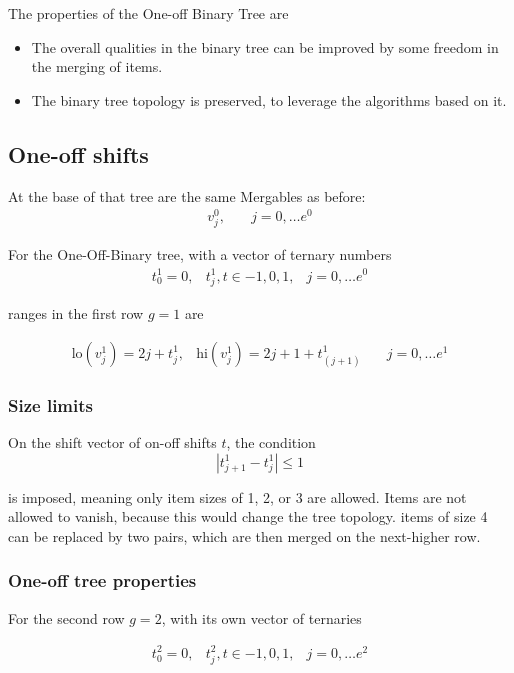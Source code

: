 \documentclass{article}
\theoremstyle{plain}
\begin{document}
The properties of the One-off Binary Tree are
\begin{itemize}
    \item The overall qualities in the binary tree can be improved by some freedom in the merging of items.
    \item The binary tree topology is preserved, to leverage the algorithms based on it.
\end{itemize}

\subsection*{One-off shifts}
At the base of that tree are the same Mergables as before:
\begin{align*}
    v^0_j, & \quad j = 0, \dots e^0
\end{align*}

For the One-Off-Binary tree, with a vector of ternary numbers 
\begin{align*}
   t^1_{0} = 0, &   t^1_{j} , t \in {-1, 0, 1},  &  j = 0, \dots e^0
\end{align*}

ranges in the first row $g=1$ are

\begin{align*}
   \text{lo}( v^1_j) = 2j +t^1_j , &  \text{hi}( v^1_j) = 2j+1+t^1_(j+1)  &  \quad j = 0, \dots e^1
\end{align*}

\subsubsection*{Size limits}
On the shift vector of on-off shifts  ${t}$, the condition
\[
\left| t^1_{j+1} - t^1_j \right| \le 1
\]

is imposed, meaning only item sizes of 1, 2, or 3 are allowed.  
Items are not allowed to vanish, because this would change the
tree topology. items of size 4 can be replaced by two pairs, which are then merged
on the next-higher row.

\subsubsection*{One-off tree properties}
For the second row $g=2$, with its own vector of ternaries 

\begin{align*}
   t^2_{0} = 0, &   t^2_{j} , t \in {-1, 0, 1},  &  j = 0, \dots e^2
\end{align*}
\end{document}
